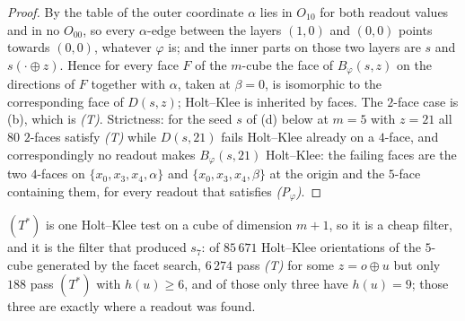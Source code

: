 \begin{proof}
By the table of  the outer coordinate $\alpha$ lies in
$O_{10}$ for both readout values and in no $O_{00}$, so every
$\alpha$-edge between the layers $(1,0)$ and $(0,0)$ points towards
$(0,0)$, whatever $\varphi$ is; and the inner parts on those two layers
are $s$ and $s(\cdot\oplus z)$. Hence for every face $F$ of the $m$-cube
the face of $B_\varphi(s,z)$ on the directions of $F$ together with
$\alpha$, taken at $\beta=0$, is isomorphic to the corresponding face of
$D(s,z)$; Holt--Klee is inherited by faces. The $2$-face case is
(b), which is \emph{(T)}. Strictness: for the seed
$s$ of (d) below at $m=5$ with $z=21$ all $80$
$2$-faces satisfy \emph{(T)} while $D(s,21)$ fails Holt--Klee already on a
$4$-face, and correspondingly no readout makes $B_\varphi(s,21)$
Holt--Klee: the failing faces are the two $4$-faces on
$\{x_0,x_3,x_4,\alpha\}$ and $\{x_0,x_3,x_4,\beta\}$ at the origin and the
$5$-face containing them, for every readout that satisfies
\emph{(P$_\varphi$)}.
\end{proof}

\begin{remark}\label{hkd:rem-tstar}
$(T^{\ast})$ is one Holt--Klee test on a cube of dimension $m+1$, so it is
a cheap filter, and it is the filter that produced $s_7$: of $85\,671$
Holt--Klee orientations of the $5$-cube generated by the facet search,
$6\,274$ pass \emph{(T)} for some $z=o\oplus u$ but only $188$ pass
$(T^{\ast})$ with $h(u)\ge6$, and of those only three have $h(u)=9$;
those three are exactly where a readout was found.
\end{remark}

